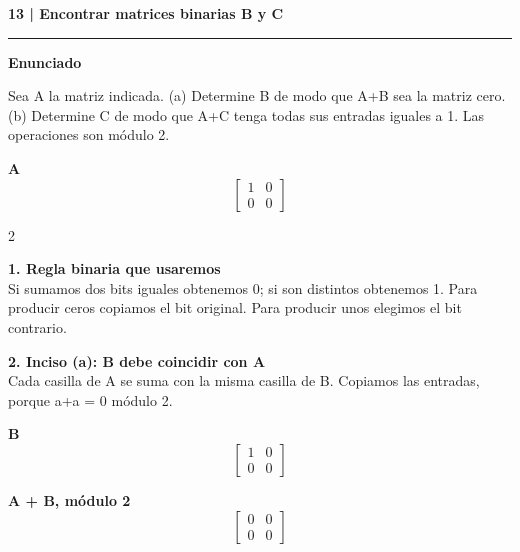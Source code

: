 \documentclass[11pt,a4paper,landscape]{article}
\newcommand{\titulo}[1]{{\LARGE\bfseries #1}\par\smallskip\hrule\medskip}
\begin{document}
\titulo{13 | Encontrar matrices binarias B y C}
\textbf{Enunciado}\par Sea A la matriz indicada. (a) Determine B de modo que A+B sea la matriz cero. (b) Determine C de modo que A+C tenga todas sus entradas iguales a 1. Las operaciones son módulo 2.
\par\smallskip \textbf{A}\[\begin{bmatrix}1 & 0\\0 & 0\end{bmatrix}\]
\begin{multicols*}{2}
\noindent\begin{minipage}{\linewidth}\textbf{1. Regla binaria que usaremos}\\[2pt]Si sumamos dos bits iguales obtenemos 0; si son distintos obtenemos 1. Para producir ceros copiamos el bit original. Para producir unos elegimos el bit contrario.
\par{}\par\smallskip
\end{minipage}\par\medskip
\noindent\begin{minipage}{\linewidth}\textbf{2. Inciso (a): B debe coincidir con A}\\[2pt]Cada casilla de A se suma con la misma casilla de B. Copiamos las entradas, porque a+a = 0 módulo 2.
\par\smallskip \begin{minipage}[t]{.47\linewidth}\centering \textbf{B}\[\begin{bmatrix}1 & 0\\0 & 0\end{bmatrix}\]\end{minipage}\hfill\begin{minipage}[t]{.47\linewidth}\centering \textbf{A + B, módulo 2}\[\begin{bmatrix}0 & 0\\0 & 0\end{bmatrix}\]\end{minipage}\par\smallskip

\end{minipage}
\end{multicols*}
\end{document}
